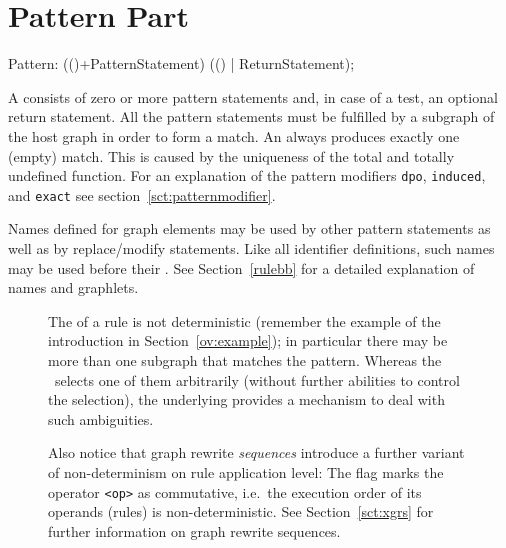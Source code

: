 \section{Pattern Part}
\label{patternpart}
\begin{rail}
  Pattern: (()+PatternStatement) (() | ReturnStatement);
\end{rail}
A  consists of zero or more pattern statements and, in case of a test, an optional return statement.
All the pattern statements must be fulfilled by a subgraph of the host graph in order to form a match. 
An  always produces exactly one (empty) match. 
This is caused by the uniqueness of the total and totally undefined function.
For an explanation of the pattern modifiers \texttt{dpo}, \texttt{induced}, and \texttt{exact} see section~\ref{sct:patternmodifier}.

Names defined for graph elements may be used by other pattern statements as well as by replace/modify statements. 
Like all identifier definitions, such names may be used before their . 
See Section~\ref{rulebb} for a detailed explanation of names and graphlets.
\begin{figure}[htbp]
\begin{note}
\label{note:indeterminism}
The  of a rule is not deterministic (remember the example of the introduction in Section~\ref{ov:example}); in particular there may be more than one subgraph that matches the pattern. 
Whereas the \GrShell\ selects one of them arbitrarily (without further abilities to control the selection), the underlying \LibGr{} provides a mechanism to deal with such ambiguities. 

Also notice that graph rewrite \emph{sequences} introduce a further variant of non-determinism on rule application level: 
The  flag marks the operator \texttt{<op>} as commutative, i.e.\ the execution order of its operands (rules) is non-deterministic. 
See Section~\ref{sct:xgrs} for further information on graph rewrite sequences.
\end{note}
\end{figure}

